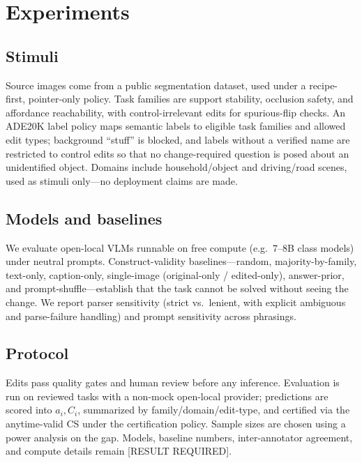 \section{Experiments}

\subsection{Stimuli}
Source images come from a public segmentation dataset, used under a recipe-first,
pointer-only policy. Task families are support stability, occlusion safety, and
affordance reachability, with control-irrelevant edits for spurious-flip checks.
An ADE20K label policy maps semantic labels to eligible task families and allowed
edit types; background ``stuff'' is blocked, and labels without a verified name
are restricted to control edits so that no change-required question is posed about
an unidentified object. Domains include household/object and driving/road scenes,
used as stimuli only---no deployment claims are made.

\subsection{Models and baselines}
We evaluate open-local VLMs runnable on free compute (e.g.\ 7--8B class models)
under neutral prompts. Construct-validity baselines---random, majority-by-family,
text-only, caption-only, single-image (original-only / edited-only), answer-prior,
and prompt-shuffle---establish that the task cannot be solved without seeing the
change. We report parser sensitivity (strict vs.\ lenient, with explicit
ambiguous and parse-failure handling) and prompt sensitivity across phrasings.

\subsection{Protocol}
Edits pass quality gates and human review before any inference. Evaluation is run
on reviewed tasks with a non-mock open-local provider; predictions are scored into
$a_i, C_i$, summarized by family/domain/edit-type, and certified via the
anytime-valid CS under the certification policy. Sample sizes are chosen using a
power analysis on the gap. Models, baseline numbers, inter-annotator agreement,
and compute details remain [RESULT REQUIRED].
